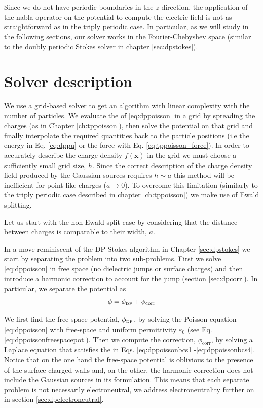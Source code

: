 \documentclass[ twoside,openright,titlepage,numbers=noenddot,%
headinclude,footinclude,cleardoublepage=empty,abstract=on,
BCOR=5mm,paper=b5,fontsize=11pt, dvipsnames
]{scrreprt}
\renewcommand{\vec}[1]{\bm{#1}}
\newcommand{\corr}{\text{corr}}
\newcommand{\dpr}{\text{\tiny DP}}
\begin{document}
Since we do not have periodic boundaries in the $z$ direction, the application of the nabla operator on the potential to compute the electric field is not as straightforward as in the triply periodic case. In particular, as we will study in the following sections, our solver works in the Fourier-Chebyshev space (similar to the doubly periodic Stokes solver in chapter \ref{sec:dpstokes}).

\section{Solver description}
We use a grid-based solver to get an algorithm with linear complexity with the number of particles. We evaluate the \rhs of \eqref{eq:dppoisson} in a grid by spreading the charges (as in Chapter \ref{ch:tppoisson}), then solve the potential on that grid and finally interpolate the required quantities back to the particle positions (i.e the energy in Eq. \eqref{eq:dppu} or the force with Eq. \eqref{eq:tppoisson_force}).
In order to accurately describe the charge density $f(\vec{x})$ in the grid we must choose a sufficiently small grid size, $h$. Since the correct description of the charge density field produced by the Gaussian sources requires $h \sim a$ this method will be inefficient for point-like charges ($a\rightarrow 0$). To overcome this limitation (similarly to the triply periodic case described in chapter \ref{ch:tppoisson}) we make use of Ewald splitting.

Let us start with the non-Ewald split case by considering that the distance between charges is comparable to their width, $a$.

In a move reminiscent of the \gls{DP} Stokes algorithm in Chapter \ref{sec:dpstokes} we start by separating the problem into two sub-problems. First we solve \eqref{eq:dppoisson} in free space (no dielectric jumps or surface charges) and then introduce a harmonic correction to account for the jump \bcs (section \ref{sec:dpcorr}). In particular, we separate the potential as
\begin{equation}
  \label{eq:dppoissonpotsep}
  \phi = \phi_{\dpr} + \phi_{\corr}
\end{equation}


We first find the free-space potential, $\phi_{\dpr}$, by solving the Poisson equation \eqref{eq:dppoisson} with free-space \bcs and uniform permittivity $\varepsilon_0$ (see Eq. \eqref{eq:dppoissonfreespacepot}). Then we compute the correction, $\phi_{\corr}$, by solving a Laplace equation that satisfies the \bcs in Eqs. \eqref{eq:dppoissonbcs1}-\eqref{eq:dppoissonbcs4}.
Notice that on the one hand the free-space potential is oblivious to the presence of the surface charged walls and, on the other, the harmonic correction does not include the Gaussian sources in its formulation. This means that each separate problem is not necessarily electroneutral, we address electroneutrality further on in section \ref{sec:dpelectroneutral}.
\end{document}
